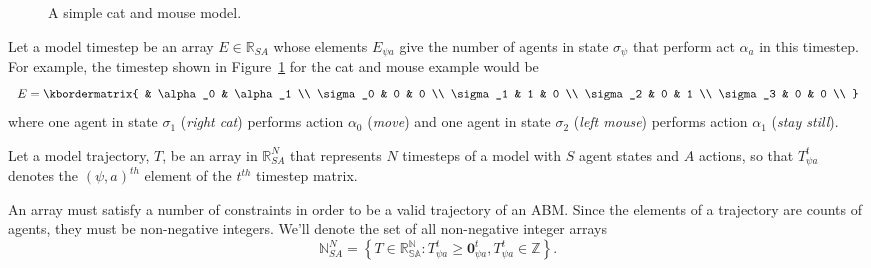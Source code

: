 \documentclass{article}
\begin{document}
\begin{figure}
	\centering
	\caption{A simple cat and mouse model.\label{fig:AB-MCMC-1}}
\end{figure}


Let a model timestep be an array $E \in \mathbb{R}_{SA}$ whose elements $E_{\psi a}$ give the number of agents in state $\sigma_\psi$ that perform act $\alpha_a$ in this timestep. For example, the timestep shown in Figure~\ref{fig:AB-MCMC-1} for the cat and mouse example would be
\[
E = \kbordermatrix{
	& \alpha_0 & \alpha_1 \\
	\sigma_0 & 0 & 0 \\
	\sigma_1 & 1 & 0 \\
	\sigma_2 & 0  & 1 \\
	\sigma_3 & 0 & 0 \\
}
\]
where one agent in state $\sigma_1$ (\textit{right cat}) performs action $\alpha_0$ (\textit{move}) and one agent in state $\sigma_2$ (\textit{left mouse}) performs action $\alpha_1$ (\textit{stay still}).

Let a model trajectory, $T$, be an array in $\mathbb{R}^N_{SA}$ that represents $N$ timesteps of a model with $S$ agent states and $A$ actions, so that $T^t_{\psi a}$ denotes the $(\psi, a)^{th}$ element of the $t^{th}$ timestep matrix.

An array must satisfy a number of constraints in order to be a valid trajectory of an ABM. Since the elements of a trajectory are counts of agents, they must be non-negative integers. We'll denote the set of all non-negative integer arrays
\begin{equation}
\mathbb{N}^N_{SA} = \left\{ T \in \mathbb{R^N_{SA}}: T^t_{\psi a} \ge \mathbf{0}^t_{\psi a}, T^t_{\psi a} \in \mathbb{Z}\right\}.
\label{nonNegativeInt}
\end{equation}
\end{document}
